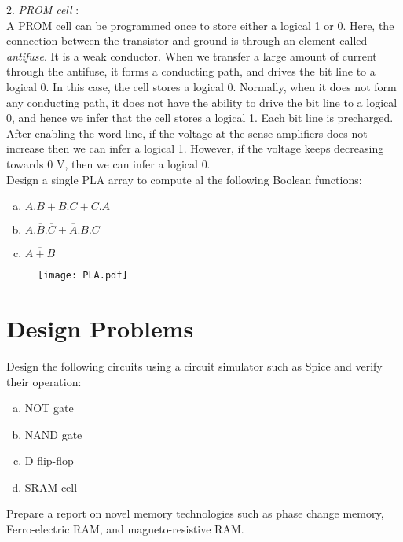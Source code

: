 \begin{ExerciseList}
2. \textit{PROM cell} : \\
A PROM cell can be programmed once to store either a logical 1 or 0. Here, the connection between the transistor and ground is through an element called \textit{antifuse}. It is a weak conductor. When we transfer a large amount of current through the antifuse, it forms a conducting path, and drives the bit line to a logical 0. In this case, the cell stores a logical 0. Normally, when it does not form any conducting path, it does not have the ability to drive the bit line to a logical 0, and hence we infer that the cell stores a logical 1. Each bit line is precharged. After enabling the word line, if the voltage at the sense amplifiers does not increase then we can infer a logical 1. However, if the voltage keeps decreasing towards 0 V, then we can infer a logical 0. \\ 
\Exercise
Design a single PLA array to compute al the following Boolean functions:

\begin{enumerate}[a)]
\item  $A.B + B.C + C.A$
\item  $A.\overline{B}.\overline{C} + \overline{A}.B.C$
\item  $\overline{A+B}$
\end{enumerate}
\Answer
\begin{figure}[H]
  \centering
  \texttt{[image: PLA.pdf]}
  \caption{}
\end{figure}
\end{ExerciseList}

\section*{Design Problems}

\begin{ExerciseList}
\Exercise
Design the following circuits using a circuit simulator such as Spice and verify their operation:

\begin{enumerate}[a)]
\item NOT gate
\item NAND gate
\item D flip-flop
\item SRAM cell
\end{enumerate}

\Exercise
Prepare a report on novel memory technologies such as phase change memory, Ferro-electric
RAM, and magneto-resistive RAM. 
\end{ExerciseList}
